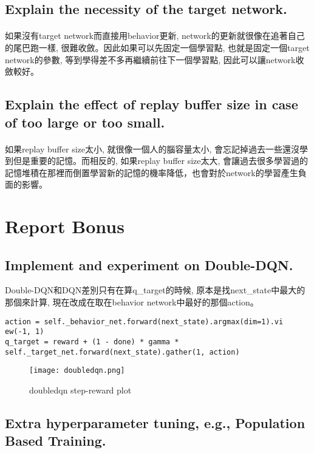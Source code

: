 \subsection{Explain the necessity of the target network.}
\paragraph{}
如果沒有target network而直接用behavior更新, network的更新就很像在追著自己的尾巴跑一樣, 很難收斂。因此如果可以先固定一個學習點, 也就是固定一個target network的參數, 等到學得差不多再繼續前往下一個學習點, 因此可以讓network收斂較好。
\subsection{Explain the effect of replay buffer size in case of too large or too small.}
\paragraph{}
如果replay buffer size太小, 就很像一個人的腦容量太小, 會忘記掉過去一些還沒學到但是重要的記憶。而相反的, 如果replay buffer size太大, 會讓過去很多學習過的記憶堆積在那裡而倒置學習新的記憶的機率降低，也會對於network的學習產生負面的影響。
\section{Report Bonus}
\subsection{Implement and experiment on Double-DQN.}
Double-DQN和DQN差別只有在算q\_target的時候, 原本是找next\_state中最大的那個來計算, 現在改成在取在behavior network中最好的那個action。
\begin{lstlisting}
action = self._behavior_net.forward(next_state).argmax(dim=1).vi
ew(-1, 1)
q_target = reward + (1 - done) * gamma * self._target_net.forward(next_state).gather(1, action)
\end{lstlisting}
\begin{figure}[!ht]
    \begin{center}
        \texttt{[image: doubledqn.png]}
        \caption{doubledqn step-reward plot}
    \end{center}
\end{figure}
\subsection{Extra hyperparameter tuning, e.g., Population Based Training.}
